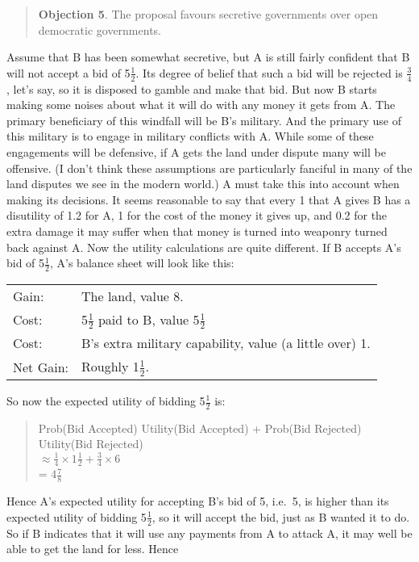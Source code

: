 \documentclass[
  10pt,
  letterpaper,
  DIV=11,
  numbers=noendperiod,
  twoside]{scrartcl}
\begin{document}
\begin{quote}
\textbf{Objection 5}. The proposal favours secretive governments over
open democratic governments.
\end{quote}

Assume that B has been somewhat secretive, but A is still fairly
confident that B will not accept a bid of 5\(\frac{1}{2}\). Its degree
of belief that such a bid will be rejected is \(\frac{3}{4}\), let's
say, so it is disposed to gamble and make that bid. But now B starts
making some noises about what it will do with any money it gets from A.
The primary beneficiary of this windfall will be B's military. And the
primary use of this military is to engage in military conflicts with A.
While some of these engagements will be defensive, if A gets the land
under dispute many will be offensive. (I don't think these assumptions
are particularly fanciful in many of the land disputes we see in the
modern world.) A must take this into account when making its decisions.
It seems reasonable to say that every 1 that A gives B has a disutility
of 1.2 for A, 1 for the cost of the money it gives up, and 0.2 for the
extra damage it may suffer when that money is turned into weaponry
turned back against A. Now the utility calculations are quite different.
If B accepts A's bid of 5\(\frac{1}{2}\), A's balance sheet will look
like this:

\begin{longtable}[]{@{}ll@{}}
\toprule\noalign{}
\endhead
\bottomrule\noalign{}
\endlastfoot
Gain: & The land, value 8. \\
Cost: & 5\(\frac{1}{2}\) paid to B, value 5\(\frac{1}{2}\) \\
Cost: & B's extra military capability, value (a little over) 1. \\
Net Gain: & Roughly 1\(\frac{1}{2}\). \\
\end{longtable}

So now the expected utility of bidding 5\(\frac{1}{2}\) is:

\begin{quote}
Prob(Bid Accepted) Utility(Bid Accepted) + Prob(Bid Rejected)
Utility(Bid Rejected)\\
\(\approx \frac{1}{4} \times 1\frac{1}{2} + \frac{3}{4} \times 6\)\\
= \(4\frac{7}{8}\)
\end{quote}

Hence A's expected utility for accepting B's bid of 5, i.e.~5, is higher
than its expected utility of bidding 5\(\frac{1}{2}\), so it will accept
the bid, just as B wanted it to do. So if B indicates that it will use
any payments from A to attack A, it may well be able to get the land for
less. Hence
\end{document}
